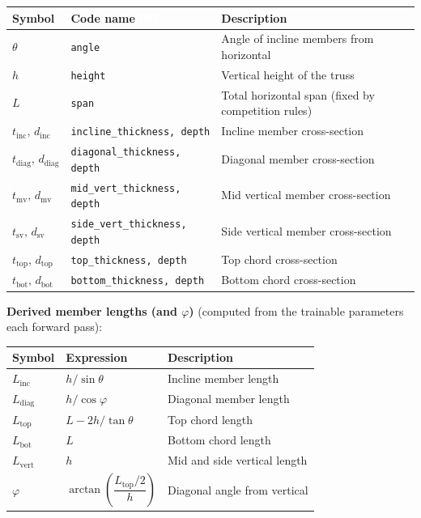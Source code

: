 \documentclass[11pt]{article}
\begin{document}
\begin{table}[H]
\centering
\begin{tabular}{@{}lll@{}}
\toprule
Symbol & Code name \textcolor{white}{007} & Description \\
\midrule
$\theta$                    & \texttt{angle}               & Angle of incline members from horizontal \\
$h$                         & \texttt{height}              & Vertical height of the truss \\
$L$\footnotemark                         & \texttt{span}                & Total horizontal span (fixed by competition rules) \\
\midrule
$t_\text{inc},\,d_\text{inc}$   & \texttt{incline\_thickness, depth}   & Incline member cross-section \\
$t_\text{diag},\,d_\text{diag}$ & \texttt{diagonal\_thickness, depth}  & Diagonal member cross-section \\
$t_\text{mv},\,d_\text{mv}$     & \texttt{mid\_vert\_thickness, depth} & Mid vertical member cross-section \\
$t_\text{sv},\,d_\text{sv}$     & \texttt{side\_vert\_thickness, depth}& Side vertical member cross-section \\
$t_\text{top},\,d_\text{top}$   & \texttt{top\_thickness, depth}       & Top chord cross-section \\
$t_\text{bot},\,d_\text{bot}$   & \texttt{bottom\_thickness, depth}    & Bottom chord cross-section \\
\bottomrule
\end{tabular}
\end{table}
\newpage
\noindent\textbf{Derived member lengths (and $\varphi$)} (computed from the trainable parameters each forward pass):

\begin{table}[H]
\centering
\begin{tabular}{@{}lll@{}}
\toprule
Symbol & Expression & Description \\
\midrule
$L_\text{inc}$  & $h / \sin\theta$     & Incline member length \\[4pt]
$L_\text{diag}$ & $h / \cos\varphi$    & Diagonal member length \\[4pt]
$L_\text{top}$  & $L - 2h/\tan\theta$  & Top chord length \\[4pt]
$L_\text{bot}$  & $L$                  & Bottom chord length \\[4pt]
$L_\text{vert}$ & $h$                  & Mid and side vertical length \\
$\varphi$ & $\arctan\!\left(\dfrac{L_\text{top}/2}{h}\right)$ & Diagonal angle from vertical \\[8pt]
\bottomrule
\end{tabular}
\end{table}
 
\end{document}
